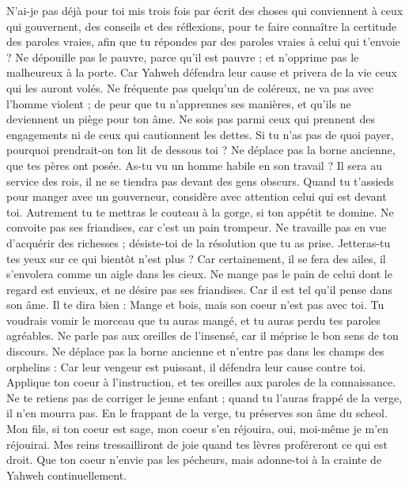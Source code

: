 \begin{multicols}{2}
N’ai-je pas déjà pour toi mis trois fois par écrit des choses qui conviennent à ceux qui gouvernent, des conseils et des réflexions,
pour te faire connaître la certitude des paroles vraies, afin que tu répondes par des paroles vraies à celui qui t’envoie ?
Ne dépouille pas le pauvre, parce qu'il est pauvre ; et n’opprime pas le malheureux à la porte.
Car Yahweh défendra leur cause et privera de la vie ceux qui les auront volés.
Ne fréquente pas quelqu’un de coléreux, ne va pas avec l'homme violent ;
de peur que tu n’apprennes ses manières, et qu’ils ne deviennent un piège pour ton âme.
Ne sois pas parmi ceux qui prennent des engagements ni de ceux qui cautionnent les dettes.
Si tu n'as pas de quoi payer, pourquoi prendrait-on ton lit de dessous toi ?
Ne déplace pas la borne ancienne, que tes pères ont posée.
As-tu vu un homme habile en son travail ? Il sera au service des rois, il ne se tiendra pas devant des gens obscurs.
\VerseOne{}Quand tu t’assieds pour manger avec un gouverneur, considère avec attention celui qui est devant toi.
Autrement tu te mettras le couteau à la gorge, si ton appétit te domine.
Ne convoite pas ses friandises, car c'est un pain trompeur.
Ne travaille pas en vue d’acquérir des richesses ; désiste-toi de la résolution que tu as prise.
Jetteras-tu tes yeux sur ce qui bientôt n'est plus ? Car certainement, il se fera des ailes, il s'envolera comme un aigle dans les cieux.
Ne mange pas le pain de celui dont le regard est envieux, et ne désire pas ses friandises.
Car il est tel qu'il pense dans son âme. Il te dira bien : Mange et bois, mais son coeur n'est pas avec toi.
Tu voudrais vomir le morceau que tu auras mangé, et tu auras perdu tes paroles agréables.
Ne parle pas aux oreilles de l’insensé, car il méprise le bon sens de ton discours.
Ne déplace pas la borne ancienne et n'entre pas dans les champs des orphelins :
Car leur vengeur est puissant, il défendra leur cause contre toi.
Applique ton coeur à l'instruction, et tes oreilles aux paroles de la connaissance.
Ne te retiens pas de corriger le jeune enfant ; quand tu l'auras frappé de la verge, il n'en mourra pas.
En le frappant de la verge, tu préserves son âme du scheol.
Mon fils, si ton coeur est sage, mon coeur s'en réjouira, oui, moi-même je m’en réjouirai.
Mes reins tressailliront de joie quand tes lèvres proféreront ce qui est droit.
Que ton coeur n'envie pas les pécheurs, mais adonne-toi à la crainte de Yahweh continuellement.

\end{multicols}
